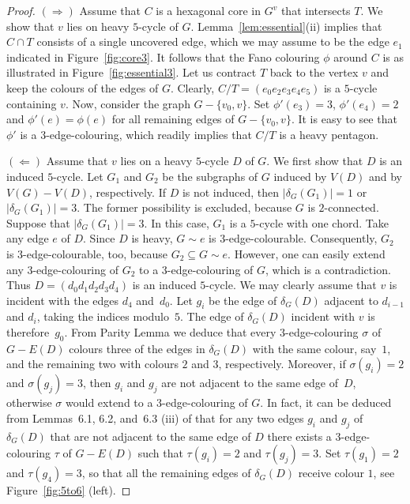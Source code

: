 \documentclass[a4paper]{amsart}
\theoremstyle{plain}
\theoremstyle{definition}
\begin{document}
\begin{proof}
$(\Rightarrow)$ Assume that $C$ is a hexagonal core in $G^v$
that intersects $T$.  We show that $v$ lies on heavy $5$-cycle
of $G$. Lemma~\ref{lem:essential}(ii) implies that $C\cap T$
consists of a single uncovered edge, which we may assume to be
the edge $e_1$ indicated in Figure~\ref{fig:core3}. It follows
that the Fano colouring $\phi$ around $C$ is as illustrated in
Figure~\ref{fig:essential3}. Let us contract $T$ back to the
vertex $v$ and keep the colours of the edges of $G$. Clearly,
$C/T=(e_0e_2e_3e_4e_5)$ is a $5$-cycle containing $v$. Now,
consider the graph $G-\{v_0,v\}$. Set $\phi'(e_3)=3$,
$\phi'(e_4)=2$ and $\phi'(e)=\phi(e)$ for all remaining edges
of $G-\{v_0,v\}$. It is easy to see that $\phi'$ is a
$3$-edge-colouring, which readily implies that $C/T$ is a heavy
pentagon.

$(\Leftarrow)$ Assume that $v$ lies on a heavy $5$-cycle $D$ of
$G$. We first show that $D$ is an induced $5$-cycle. Let $G_1$
and $G_2$ be the subgraphs of $G$ induced by $V(D)$ and by
$V(G)-V(D)$, respectively. If $D$ is not induced, then
$|\delta_G(G_1)|=1$ or $|\delta_G(G_1)|=3$. The former
possibility is excluded, because $G$ is $2$-connected. Suppose
that $|\delta_G(G_1)|=3$. In this case, $G_1$ is a $5$-cycle
with one chord. Take any edge $e$ of $D$. Since $D$ is heavy,
$G\sim e$ is $3$-edge-colourable. Consequently, $G_2$ is
$3$-edge-colourable, too, because $G_2\subseteq G\sim e$.
However, one can easily extend any $3$-edge-colouring of $G_2$
to a $3$-edge-colouring of $G$, which is a contradiction. Thus
$D=(d_0d_1d_2d_3d_4)$ is an induced $5$-cycle. We may clearly
assume that $v$ is incident with the edges $d_4$ and~$d_0$. Let
$g_i$ be the edge of $\delta_G(D)$ adjacent to $d_{i-1}$ and
$d_i$, taking the indices modulo~$5$. The edge of $\delta_G(D)$
incident with $v$ is therefore~$g_0$. From Parity Lemma we
deduce that every $3$-edge-colouring $\sigma$ of $G-E(D)$
colours three of the edges in $\delta_G(D)$ with the same
colour, say~$1$, and the remaining two with colours $2$ and
$3$, respectively. Moreover, if $\sigma(g_i)=2$ and
$\sigma(g_j)=3$, then $g_i$ and $g_j$ are not adjacent to the
same edge of~$D$, otherwise $\sigma$ would extend to a
$3$-edge-colouring of $G$. In fact, it can be deduced from
Lemmas~6.1, 6.2, and~6.3 (iii) of \cite{NS-decred} that for any
two edges $g_i$ and $g_j$ of $\delta_G(D)$ that are not
adjacent to the same edge of $D$ there exists a
$3$-edge-colouring $\tau$ of $G-E(D)$ such that $\tau(g_i)=2$
and $\tau(g_j)=3$. Set $\tau(g_1)=2$ and $\tau(g_4)=3$, so that
all the remaining edges of $\delta_G(D)$ receive colour $1$,
see Figure~\ref{fig:5to6} (left).


\end{proof}
\end{document}
